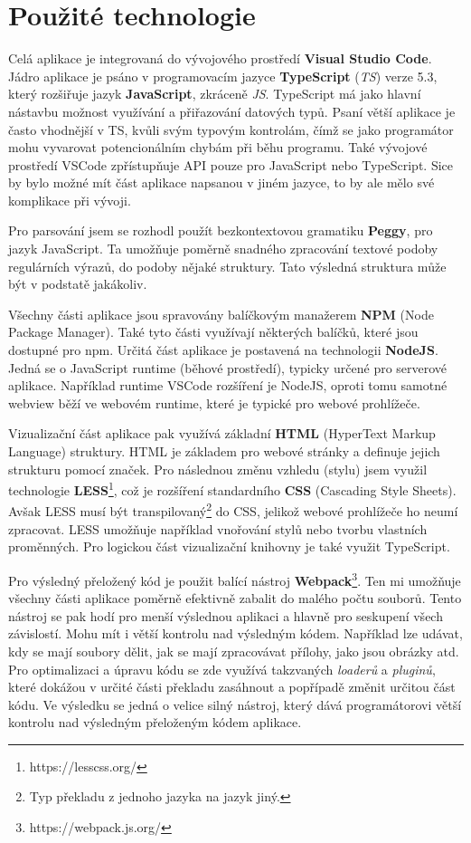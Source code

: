\newpage

\section{Použité technologie}\label{sec:USEDtech}
Celá aplikace je integrovaná do vývojového prostředí \textbf{Visual Studio Code}. 
Jádro aplikace je psáno v programovacím jazyce \textbf{TypeScript} (\textit{TS}) verze 5.3, který rozšiřuje jazyk \textbf{JavaScript}, zkráceně \textit{JS}. 
TypeScript má jako hlavní nástavbu možnost využívání a přiřazování datových typů.
Psaní větší aplikace je často vhodnější v TS, kvůli svým typovým kontrolám, čímž se jako programátor mohu vyvarovat potencionálním chybám při běhu programu.
Také vývojové prostředí VSCode zpřístupňuje API pouze pro JavaScript nebo TypeScript.
Sice by bylo možné mít část aplikace napsanou v jiném jazyce, to by ale mělo své komplikace při vývoji.

Pro parsování jsem se rozhodl použít bezkontextovou gramatiku \textbf{Peggy}\cite{Peggy, Peggyjs}, pro jazyk JavaScript.
Ta umožňuje poměrně snadného zpracování textové podoby regulárních výrazů, do podoby nějaké struktury.
Tato výsledná struktura může být v podstatě jakákoliv.

Všechny části aplikace jsou spravovány balíčkovým manažerem \textbf{NPM} (Node Package Manager).
Také tyto části využívají některých balíčků, které jsou dostupné pro npm. 
Určitá část aplikace je postavená na technologii \textbf{NodeJS}.
Jedná se o JavaScript runtime (běhové prostředí), typicky určené pro serverové aplikace. 
Například runtime VSCode rozšíření je NodeJS, oproti tomu samotné webview běží ve webovém runtime, které je typické pro webové prohlížeče.

Vizualizační část aplikace pak využívá základní \textbf{HTML} (HyperText Markup Language) struktury.  
HTML je základem pro webové stránky a definuje jejich strukturu pomocí značek.
Pro následnou změnu vzhledu (stylu) jsem využil technologie \textbf{LESS}\footnote{https://lesscss.org/}, což je rozšíření standardního \textbf{CSS} (Cascading Style Sheets).
Avšak LESS musí být transpilovaný\footnote{Typ překladu z jednoho jazyka na jazyk jiný.} do CSS, jelikož webové prohlížeče ho neumí zpracovat. 
LESS umožňuje například vnořování stylů nebo tvorbu vlastních proměnných.
Pro logickou část vizualizační knihovny je také využit TypeScript.

Pro výsledný přeložený kód je použit balící nástroj \textbf{Webpack}\footnote{https://webpack.js.org/}.
Ten mi umožňuje všechny části aplikace poměrně efektivně zabalit do malého počtu souborů. 
Tento nástroj se pak hodí pro menší výslednou aplikaci a hlavně pro seskupení všech závislostí.
Mohu mít i větší kontrolu nad výsledným kódem.
Například lze udávat, kdy se mají soubory dělit, jak se mají zpracovávat přílohy, jako jsou obrázky atd.
Pro optimalizaci a úpravu kódu se zde využívá takzvaných \textit{loaderů} a \textit{pluginů}, 
které dokážou v určité části překladu zasáhnout a popřípadě změnit určitou část kódu.
Ve výsledku se jedná o velice silný nástroj, který dává programátorovi větší kontrolu nad výsledným přeloženým kódem aplikace.


